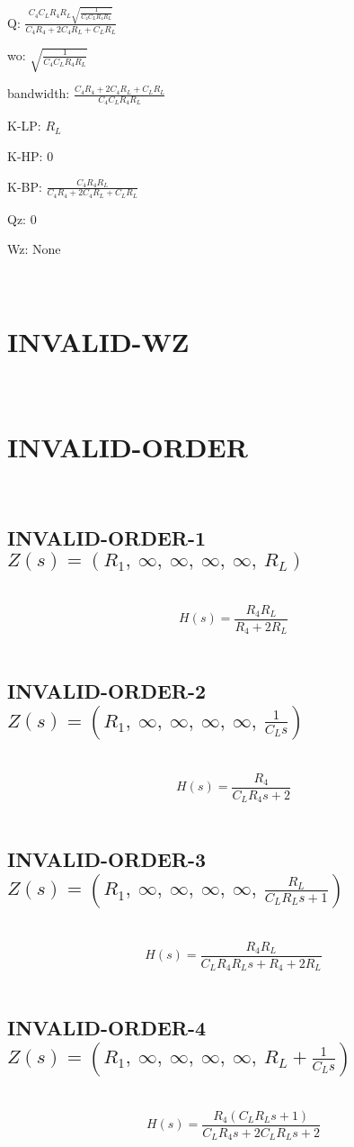 \documentclass{article}
\begin{document}
Q: $\frac{C_{4} C_{L} R_{4} R_{L} \sqrt{\frac{1}{C_{4} C_{L} R_{4} R_{L}}}}{C_{4} R_{4} + 2 C_{4} R_{L} + C_{L} R_{L}}$\ 

wo: $\sqrt{\frac{1}{C_{4} C_{L} R_{4} R_{L}}}$\ 

bandwidth: $\frac{C_{4} R_{4} + 2 C_{4} R_{L} + C_{L} R_{L}}{C_{4} C_{L} R_{4} R_{L}}$\ 

K-LP: $R_{L}$\ 

K-HP: $0$\ 

K-BP: $\frac{C_{4} R_{4} R_{L}}{C_{4} R_{4} + 2 C_{4} R_{L} + C_{L} R_{L}}$\ 

Qz: $0$\ 

Wz: $\text{None}$\ 

\ 

\section{INVALID-WZ}\ 
\section{INVALID-ORDER}\ 
\subsection{INVALID-ORDER-1 $Z(s) = \left( R_{1}, \  \infty, \  \infty, \  \infty, \  \infty, \  R_{L}\right)$ } \ 
\textbf{\[H(s) = \frac{R_{4} R_{L}}{R_{4} + 2 R_{L}}\] } \ 
\subsection{INVALID-ORDER-2 $Z(s) = \left( R_{1}, \  \infty, \  \infty, \  \infty, \  \infty, \  \frac{1}{C_{L} s}\right)$ } \ 
\textbf{\[H(s) = \frac{R_{4}}{C_{L} R_{4} s + 2}\] } \ 
\subsection{INVALID-ORDER-3 $Z(s) = \left( R_{1}, \  \infty, \  \infty, \  \infty, \  \infty, \  \frac{R_{L}}{C_{L} R_{L} s + 1}\right)$ } \ 
\textbf{\[H(s) = \frac{R_{4} R_{L}}{C_{L} R_{4} R_{L} s + R_{4} + 2 R_{L}}\] } \ 
\subsection{INVALID-ORDER-4 $Z(s) = \left( R_{1}, \  \infty, \  \infty, \  \infty, \  \infty, \  R_{L} + \frac{1}{C_{L} s}\right)$ } \ 
\textbf{\[H(s) = \frac{R_{4} \left(C_{L} R_{L} s + 1\right)}{C_{L} R_{4} s + 2 C_{L} R_{L} s + 2}\] } \ 
\end{document}

